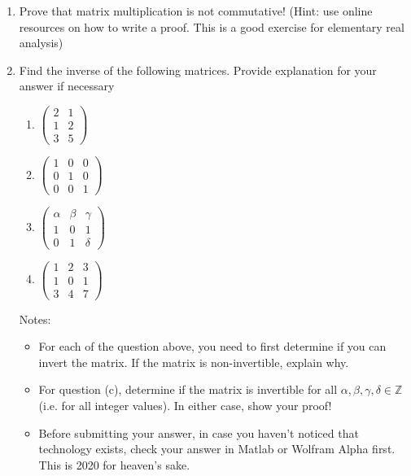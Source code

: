 \documentclass[letter,11pt]{article}
\begin{document}
\begin{enumerate}

\item Prove that matrix multiplication is not commutative! (Hint: use online resources on how to write a proof. This is a good exercise for elementary real analysis)
\item Find the inverse of the following matrices. Provide explanation for your answer if necessary
\begin{multicols}{4}
\begin{enumerate}

\item $\begin{pmatrix}
2 & 1 
\\
1 & 2 
\\ 
3 & 5
\end{pmatrix}$ \\

\item $\begin{pmatrix}
1 & 0 & 0
\\
0 & 1 & 0
\\ 
0 & 0 & 1
\end{pmatrix}$ \\

\item $\begin{pmatrix}
\alpha & \beta & \gamma
\\
1 & 0 & 1
\\ 
0 & 1 & \delta
\end{pmatrix}$ \\

\item $\begin{pmatrix}
1 & 2 & 3
\\
1 & 0 & 1
\\ 
3 & 4 & 7
\end{pmatrix}$
\end{enumerate}
\end{multicols} 

Notes: 
\begin{itemize}
\item For each of the question above, you need to first determine if you can invert the matrix. If the matrix is non-invertible, explain why.
\item For question (c), determine if the matrix is invertible for all $\alpha, \beta, \gamma, \delta \in \mathbb{Z}$ (i.e. for all integer values). In either case, show your proof!
\item Before submitting your answer, in case you haven't noticed that technology exists, check your answer in Matlab or Wolfram Alpha first. This is 2020 for heaven's sake.
\end{itemize}



\end{enumerate}
\end{document}
